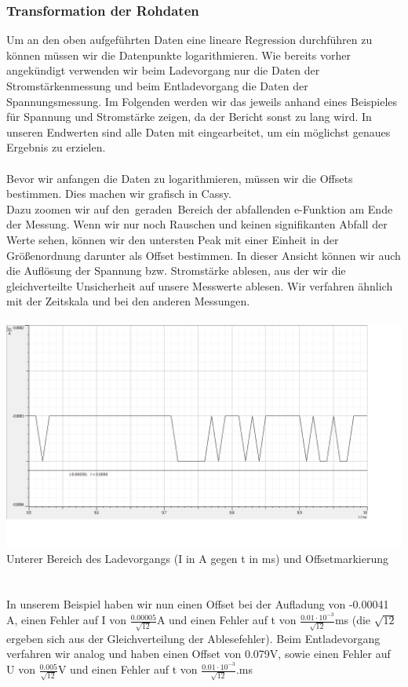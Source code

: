 \documentclass[12pt,a4paper]{article}
\begin{document}
\subsubsection{Transformation der Rohdaten}
Um an den oben aufgeführten Daten eine lineare Regression durchführen zu können müssen wir die Datenpunkte logarithmieren. Wie bereits vorher angekündigt verwenden wir beim Ladevorgang nur die Daten der Stromstärkenmessung und beim Entladevorgang die Daten der Spannungsmessung. Im Folgenden werden wir das jeweils anhand eines Beispieles für Spannung und Stromstärke zeigen, da der Bericht sonst zu lang wird. In unseren Endwerten sind alle Daten mit eingearbeitet, um ein möglichst genaues Ergebnis zu erzielen.\\
\\Bevor wir anfangen die Daten zu logarithmieren, müssen wir die Offsets bestimmen. Dies machen wir grafisch in Cassy.\\
Dazu zoomen wir auf den $\,$geraden$\,$ Bereich der abfallenden e-Funktion am Ende der Messung. Wenn wir nur noch Rauschen und keinen signifikanten Abfall der Werte sehen, können wir den untersten Peak mit einer Einheit in der Größenordnung darunter als Offset bestimmen. In dieser Ansicht können wir auch die Auflösung der Spannung bzw. Stromstärke ablesen, aus der wir die gleichverteilte Unsicherheit auf unsere Messwerte ablesen. Wir verfahren ähnlich mit der Zeitskala und bei den anderen Messungen.\\
\\
\includegraphics[scale=0.35]{offset_und_fehler.png}\\
Unterer Bereich des Ladevorgangs (I in A gegen t in ms) und Offsetmarkierung\\
\\
\\In unserem Beispiel haben wir nun einen Offset bei der Aufladung von -0.00041 A, einen Fehler auf I von $\frac{0.00005}{\sqrt{12}}$A und einen Fehler auf t von $\frac{0.01\cdot10^{-3}}{\sqrt{12}}$ms (die $\sqrt{12}$ ergeben sich aus der Gleichverteilung der Ablesefehler). Beim Entladevorgang verfahren wir analog und haben einen Offset von 0.079V, sowie einen Fehler auf U von $\frac{0.005}{\sqrt{12}}$V und einen Fehler auf t von $\frac{0.01\cdot10^{-3}}{\sqrt{12}}$.ms\\
\end{document}
